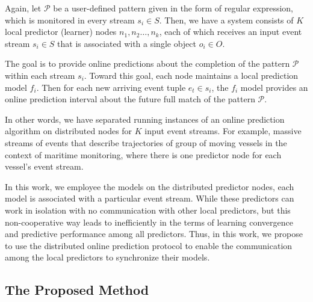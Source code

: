 \par Again, let $\mathcal{P}$ be a user-defined pattern given in the form of regular expression, which is monitored in every stream $s_i \in S$. Then, we have a system consists of \emph{$K$} local predictor (learner) nodes $n_1,n_2\dots,n_k$, each of which receives an input event stream $s_i\in S$ that is associated with a single object $o_i \in O$.

\par  The goal is to provide online predictions about the completion of the pattern $\mathcal{P}$ within each stream $s_i$. Toward this goal, each node maintains a local prediction model $f_i$. Then for each new arriving event tuple  $e_t \in s_i$, the $f_i$ model provides an online prediction interval about the future full match of the pattern $\mathcal{P}$.

\par In other words, we have separated running instances of an online prediction algorithm on distributed nodes for \emph{$K$} input event streams. For example, massive streams of events that describe trajectories of group of moving vessels in the context of maritime monitoring, where there is one predictor node for each vessel's event stream.
  
  
  \par In this work, we employee the \pmcmr models on the distributed predictor nodes, each model is associated with a particular event stream. While these predictors can work in isolation with no communication with other local predictors, but this non-cooperative way leads to inefficiently in the terms of learning convergence and predictive performance among all predictors. Thus, in this work, we propose to use the distributed online prediction protocol \cite{kamp2014communication} to enable the communication among the local predictors to synchronize their models.     
%

\subsection{The Proposed Method}
\label{sec:proposed_approach}

